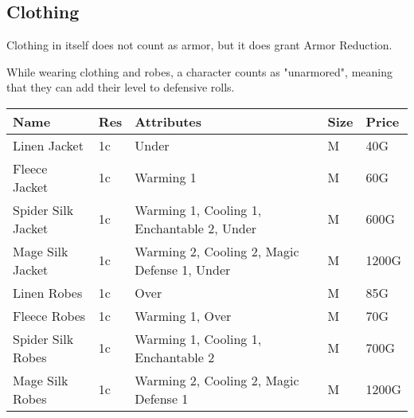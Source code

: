 \subsection{Clothing}\label{subsec:clothing}

Clothing in itself does not count as armor, but it does grant Armor Reduction.

While wearing clothing and robes, a character counts as "unarmored", meaning that they can add their level to defensive rolls.

\begin{longtable}{p{3cm} | p{1.5cm} | p{5cm} | p{1cm} | p{1.5cm}}
	Name & Res &   Attributes & Size & Price\\ \hline
	Linen Jacket & 1c & Under & M & 40G\\
	
	Fleece Jacket & 1c & Warming 1 & M & 60G\\
	
	Spider Silk Jacket & 1c & Warming 1, Cooling 1, Enchantable 2, Under & M & 600G\\
	
	Mage Silk Jacket & 1c & Warming 2, Cooling 2, Magic Defense 1, Under & M & 1200G\\
	
	Linen Robes & 1c & Over & M & 85G\\
	
	Fleece Robes & 1c & Warming 1, Over & M & 70G\\

	Spider Silk Robes & 1c & Warming 1, Cooling 1, Enchantable 2 & M & 700G\\
	
	Mage Silk Robes & 1c & Warming 2, Cooling 2, Magic Defense 1 & M & 1200G\\
\end{longtable}
